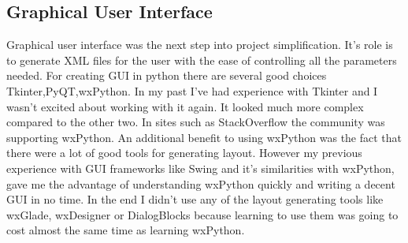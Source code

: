\subsection{Graphical User Interface}
Graphical user interface was the next step into project simplification. It's role is to generate XML files for the user with the ease of controlling all the parameters needed.
For creating GUI in python there are several good choices Tkinter,PyQT,wxPython. In my past I've had experience with Tkinter and I wasn't excited about working with it again. It looked
much more complex compared to the other two. In sites such as StackOverflow the community was supporting wxPython. An additional benefit to using wxPython was the fact that there were a
lot of good tools for generating layout. However my previous experience with GUI frameworks like Swing and it's similarities with wxPython, gave me the advantage of understanding wxPython
quickly and writing a decent GUI in no time. In the end I didn't use any of the layout generating tools like wxGlade, wxDesigner or DialogBlocks because learning to use them was going to
cost almost the same time as learning wxPython.